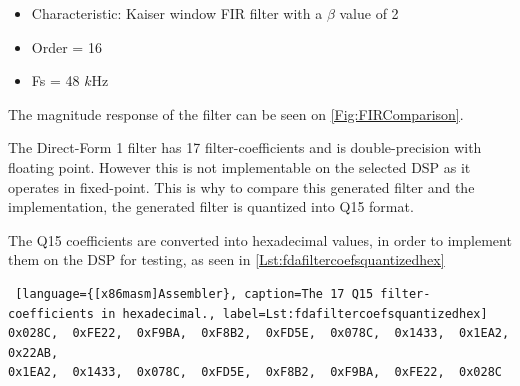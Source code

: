 
\begin{itemize}
	\item Characteristic: Kaiser window FIR filter with a $\beta$ value of 2
	\item Order = 16
	\item Fs = 48 $k$Hz
\end{itemize}


The magnitude response of the filter can be seen on \autoref{Fig:FIRComparison}. 



The Direct-Form 1 filter has 17 filter-coefficients and is double-precision with floating point. However this is not implementable on the selected DSP as it operates in fixed-point. This is why to compare this generated filter and the implementation, the generated filter is quantized into Q15 format.


The Q15 coefficients are converted into hexadecimal values, in order to implement them on the DSP for testing, as seen in \autoref{Lst:fdafiltercoefsquantizedhex} 

\begin{lstlisting} [language={[x86masm]Assembler}, caption=The 17 Q15 filter-coefficients in hexadecimal., label=Lst:fdafiltercoefsquantizedhex]
0x028C,  0xFE22,  0xF9BA,  0xF8B2,  0xFD5E,  0x078C,  0x1433,  0x1EA2,  0x22AB,  
0x1EA2,  0x1433,  0x078C,  0xFD5E,  0xF8B2,  0xF9BA,  0xFE22,  0x028C
\end{lstlisting}

